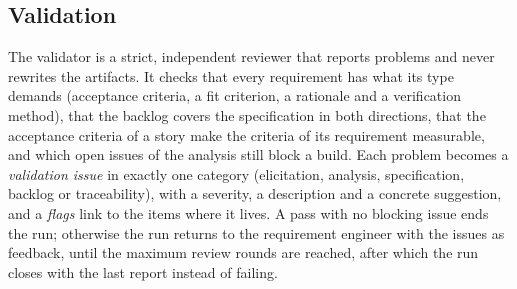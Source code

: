 \subsection{Validation}
\label{sec:pa-validation}

The validator is a strict, independent reviewer that reports problems and never rewrites the artifacts. It checks that every requirement has what its type demands (acceptance criteria, a fit criterion, a rationale and a verification method), that the backlog covers the specification in both directions, that the acceptance criteria of a story make the criteria of its requirement measurable, and which open issues of the analysis still block a build. Each problem becomes a \emph{validation issue} in exactly one category (elicitation, analysis, specification, backlog or traceability), with a severity, a description and a concrete suggestion, and a \emph{flags} link to the items where it lives. A pass with no blocking issue ends the run; otherwise the run returns to the requirement engineer with the issues as feedback, until the maximum review rounds are reached, after which the run closes with the last report instead of failing.
